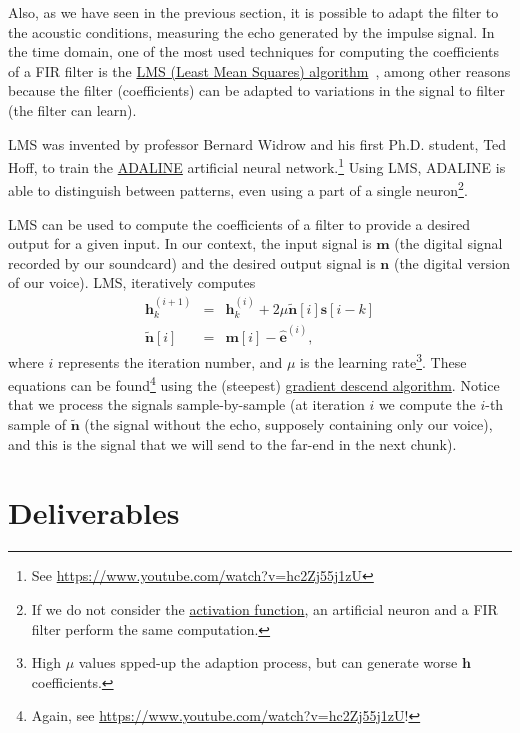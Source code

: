 Also, as we have seen in the previous section, it is possible to adapt
the filter to the acoustic conditions, measuring the echo generated by
the impulse signal. In the time domain, one of the most used
techniques for computing the coefficients of a FIR filter is the
\href{https://en.wikipedia.org/wiki/Least_mean_squares_filter}{LMS
  (Least Mean Squares)
  algorithm}~\cite{haykin1995adaptive,boyd2004convex}, among other
reasons because the filter (coefficients) can be adapted to variations
in the signal to filter (the filter can learn).

LMS was invented by professor Bernard Widrow and his first
Ph.D. student, Ted Hoff, to train the
\href{https://en.wikipedia.org/wiki/ADALINE}{ADALINE} artificial
neural network.\footnote{See
  \url{https://www.youtube.com/watch?v=hc2Zj55j1zU}} Using LMS,
ADALINE is able to distinguish between patterns, even
using a part of a single neuron\footnote{If we do not consider the
  \href{https://en.wikipedia.org/wiki/Activation_function}{activation
    function}, an artificial neuron and a FIR filter perform the same
  computation.}.

LMS can be used to compute the coefficients of a filter to provide a
desired output for a given input. In our
context, the input signal is ${\mathbf m}$ (the digital signal
recorded by our soundcard) and the desired output signal is
${\mathbf n}$ (the digital version of our voice). LMS, iteratively
computes
\begin{eqnarray}
  {\mathbf h}^{(i+1)}_k & = & {\mathbf h}^{(i)}_k + 2\mu\tilde{\mathbf n}[i]{\mathbf s}[i-k] \\
  \tilde{\mathbf n}[i] & = & {\mathbf m}[i] - \hat{\mathbf e}^{(i)},
\end{eqnarray}
where $i$ represents the iteration number, and $\mu$ is the learning
rate\footnote{High $\mu$ values spped-up the adaption process, but can
generate worse ${\mathbf h}$ coefficients.}. These equations can be
found\footnote{Again, see
\url{https://www.youtube.com/watch?v=hc2Zj55j1zU}!} using the
(steepest)
\href{https://en.wikipedia.org/wiki/Gradient_descent}{gradient descend
  algorithm}. Notice that we process the signals sample-by-sample (at
iteration $i$ we compute the $i$-th sample of $\tilde{\mathbf n}$ (the
signal without the echo, supposely containing only our voice), and
this is the signal that we will send to the far-end in the next
chunk).

\section{Deliverables}

